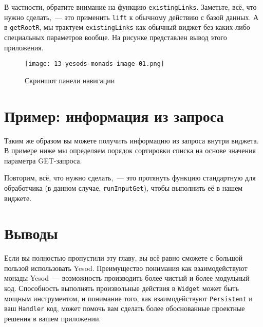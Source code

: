 

В частности, обратите внимание на функцию \lstinline'existingLinks'. Заметьте,
всё, что нужно сделать,~--- это применить \lstinline'lift' к обычному действию с
базой данных. А в \lstinline'getRootR', мы трактуем \lstinline'existingLinks'
как обычный виджет без каких-либо специальных параметров вообще. На
рисунке представлен вывод этого приложения.

\begin{figure}[tbh]
  \centering
  \texttt{[image: 13-yesods-monads-image-01.png]}
  \caption{Скриншот панели навигации}
\end{figure}

\section{Пример: информация из запроса}
Таким же образом вы можете получить информацию из запроса внутри виджета. В
примере ниже мы определяем порядок сортировки списка на основе значения
параметра GET-запроса.



Повторим, всё, что нужно сделать,~--- это протянуть функцию стандартную для
обработчика (в данном случае, \lstinline'runInputGet'), чтобы выполнить её в
нашем виджете.

\section{Выводы}
Если вы полностью пропустили эту главу, вы всё равно сможете с большой пользой
использовать Yesod. Преимущество понимания как взаимодействуют монады
Yesod~--- возможность производить более чистый и более модульный код. Способность
выполнять произвольные действия в \lstinline'Widget' может быть мощным инструментом, и
понимание того, как взаимодействуют \lstinline'Persistent' и ваш \lstinline'Handler' код,
может помочь вам сделать более обоснованные проектные решения в вашем приложении.
